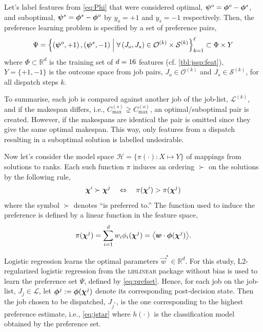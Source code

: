 \documentclass[smallextended]{svjour3}
\begin{document}
Let's label features from \cref{eq:Phi} that were considered optimal, 
\mbox{$\bm \psi^{o}=\bm{\phi}^{o}-\bm{\phi}^{s}$}, and suboptimal, 
\mbox{$\bm \psi^{s}=\bm{\phi}^{s}-\bm{\phi}^{o}$} by $y_o=+1$ and $y_s=-1$ respectively.  
Then, the preference learning problem is specified by a set of preference pairs,
\begin{equation}
\Psi = 
\left\{\left(\bm \psi^o,+1\right),\left(\bm \psi^s,-1\right)
\;\middle|\;\forall \left(J_o,J_s\right) \in \mathcal{O}^{(k)} \times 
\mathcal{S}^{(k)}\right\}_{k=1}^{\ell} \subset \Phi\times Y \label{eq:prefset}
\end{equation}
where $\Phi\subset \mathbb{R}^d$ is the training set of $d=16$ 
features (cf. \cref{tbl:jssp:feat}), $Y=\{+1,-1\}$ is the outcome space from 
job pairs, $J_o\in\mathcal{O}^{(k)}$ and $J_s\in\mathcal{S}^{(k)}$, for all 
dispatch steps $k$.

To summarise, each job is compared against another job of the job-list, 
$\mathcal{L}^{(k)}$, and if the makespan differs, i.e., $C_{\max}^{(s)}\gneq 
C_{\max}^{(o)}$, an optimal/suboptimal pair is created. 
However, if the makespans are identical the pair is omitted since they give the 
same optimal makespan. 
This way, only features from a dispatch resulting in a suboptimal solution is 
labelled undesirable.

Now let's consider the model space $\mathcal{H} = \{\pi(\cdot) : X \mapsto Y\}$ 
of mappings from solutions to ranks. Each such 
function $\pi$ induces an ordering $\succ$ on the solutions  by the following 
rule,
\begin{equation}\label{eq:linear}
\bm \chi^i \succ \bm \chi^j \quad \Leftrightarrow \quad \pi(\bm \chi^i) > 
\pi(\bm \chi^j)
\end{equation}
where the symbol $\succ$ denotes ``is preferred to.''  The function used to 
induce the preference is defined by a linear function in the feature space,
\begin{equation} 
\pi(\vchi^j)=\sum_{i=1}^d w_i\phi_i(\vchi^j)=\inner{\vec{w}}{\vphi(\vchi^j)}.
\end{equation}

Logistic regression learns the optimal parameters $\vec{w}^*\in\mathbb{R}^d$. 
For this study, L2-regularized logistic regression from the \textsc{liblinear} 
package \cite{liblinear} without bias is used to learn the preference set 
$\Psi$, defined by \cref{eq:prefset}.
Hence, for each job on the job-list, $J_j\in\mathcal{L}$, let 
$\bm{\phi}^j:=\bm{\phi}(\bm \chi^j)$ denote its corresponding  post-decision state. 
Then the job chosen to be dispatched, $J_{j^*}$, is the one corresponding to 
the highest preference estimate, i.e., \cref{eq:jstar} where $h(\cdot)$ is the 
classification model obtained by the preference set.
\end{document}
